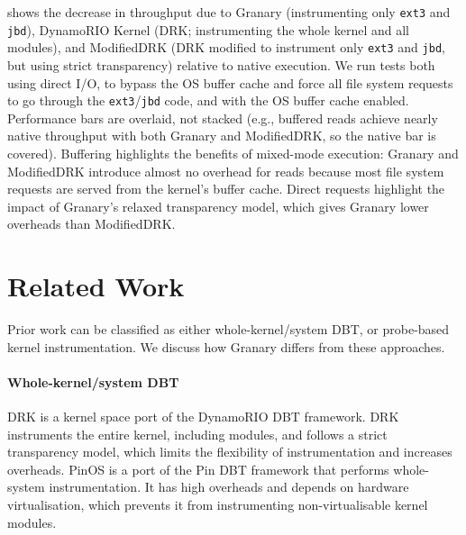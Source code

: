 \documentclass[preprint]{sigplanconf}
\begin{document}
 shows the decrease in throughput due to Granary (instrumenting only \texttt{ext3} and \texttt{jbd}), DynamoRIO Kernel (DRK; instrumenting the whole kernel and all modules), and ModifiedDRK (DRK modified to instrument only \texttt{ext3} and \texttt{jbd}, but using strict transparency) relative to native execution.  We run tests both using direct I/O, to bypass the OS buffer cache and force all file system requests to go through the \texttt{ext3}/\texttt{jbd} code, and with the OS buffer cache enabled.  Performance bars are overlaid, not stacked (e.g., buffered reads achieve nearly native throughput with both Granary and ModifiedDRK, so the native bar is covered).  Buffering highlights the benefits of mixed-mode execution: Granary and ModifiedDRK introduce almost no overhead for reads because most file system requests are served from the kernel's buffer cache. Direct requests highlight the impact of Granary's relaxed transparency model, which gives Granary lower overheads than ModifiedDRK.


\section{Related Work}\label{sec:related}
Prior work can be classified as either whole-kernel/system DBT, or probe-based kernel instrumentation. We discuss how Granary differs from these approaches.
\vspace{-3pt}\paragraph{Whole-kernel/system DBT} DRK \cite{DRK} is a kernel space port of the DynamoRIO \cite{DynamoRIO} DBT framework. DRK instruments the entire kernel, including modules, and follows a strict transparency model, which limits the flexibility of instrumentation and increases overheads.  PinOS \cite{PinOS} is a port of the Pin \cite{Pin} DBT framework that performs whole-system instrumentation. It has high overheads and depends on hardware virtualisation, which prevents it from instrumenting non-virtualisable kernel modules. 
\end{document}
